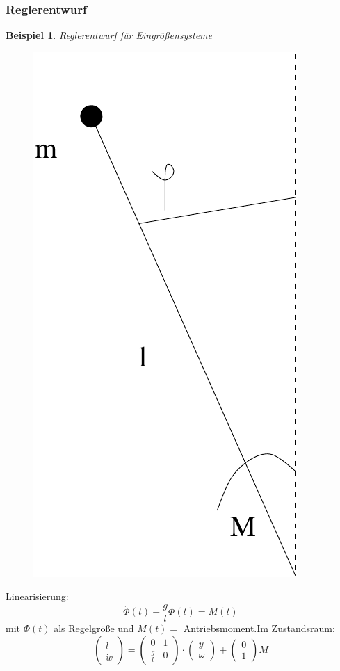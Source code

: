 \documentclass[12pt,a4paper,ngerman]{scrartcl}
\newtheorem{bsp}{Beispiel}[section] %
\begin{document}
\subsubsection{Reglerentwurf}

\begin{bsp}
Reglerentwurf für Eingrößensysteme
\end{bsp}
\begin{figure}[H]
  \centering
  \includegraphics[width=.2\linewidth]{sysregel_No_6}
\end{figure}
Linearisierung:
\[
\ddot{\Phi}(t)-\frac{g}{l}\Phi(t)=M(t)
\]
mit $\Phi(t)$ als Regelgröße und $M(t) =$ Antriebsmoment.Im Zustandsraum:
\[
\begin{pmatrix}
  \dot{l}\\\dot{w}
\end{pmatrix}
=
\begin{pmatrix}
  0&1\\
\frac{g}{l}&0
\end{pmatrix}
\cdot
\begin{pmatrix}
  y\\\omega
\end{pmatrix}
+
\begin{pmatrix}
  0\\1
\end{pmatrix}
M
\]
\end{document}

